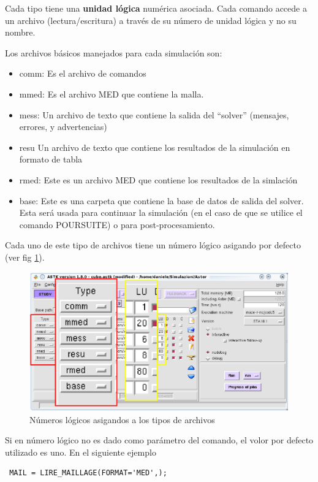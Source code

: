 \documentclass[12pt]{book}
\theoremstyle{definition}
\theoremstyle{remark}
\theoremstyle{plain}
\begin{document}
Cada tipo tiene una \textbf{unidad lógica} numérica asociada. Cada comando accede
a un archivo (lectura/escritura) a través de su número de unidad lógica y no su nombre. 

Los archivos básicos manejados para cada simulación son:
\begin{itemize}
 \item comm: Es el archivo de comandos
 \item mmed: Es el archivo MED que contiene la malla.
 \item mess: Un archivo de texto que contiene la salida del ``solver'' (mensajes, errores,
y advertencias)
 \item resu Un archivo de texto que contiene los resultados de la 
simulación en formato de tabla
 \item rmed: Este es un archivo MED que contiene los resultados de la simlación
 \item base: Este es una carpeta que contiene la base de datos de salida del solver. Esta
será usada para continuar la simulación (en el caso de que se utilice el 
comando POURSUITE) o para post-procesamiento.
\end{itemize}

Cada uno de este tipo de archivos tiene un número lógico asigando por defecto (ver 
fig \ref{fig5}).

\begin{figure}
\centering
\includegraphics[width=5in]{numeroslogicos.png}
\caption{Números lógicos asigandos a los tipos de archivos}
\label{fig5}
\end{figure}

Si en número lógico no es dado como parámetro del comando, el volor por defecto 
utilizado es uno. En el siguiente ejemplo

\begin{verbatim}
 MAIL = LIRE_MAILLAGE(FORMAT='MED',);
\end{verbatim}
\end{document}
